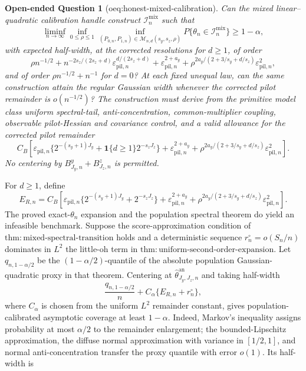 \documentclass{article}
\newtheorem{openendedquestion}{Open-ended Question}
\begin{document}
\begin{openendedquestion}[oeq:honest-mixed-calibration]\label{oeq:honest-mixed-calibration}
Can the mixed linear--quadratic calibration handle construct \(\mathcal I_n^{\mathrm{mix}}\) such that
\[
\liminf_{n\to\infty}\inf_{0\le\rho\le1}\inf_{(P_{0,n},P_{1,n})\in\mathcal M_{n,d}(s_y,s_z,\rho)}P\{\theta_n\in\mathcal I_n^{\mathrm{mix}}\}\ge1-\alpha,
\]
with expected half-width, at the corrected resolutions for \(d\ge1\), of order
\[
\rho n^{-1/2}
+n^{-2s_z/(2s_z+d)}\varepsilon_{\mathrm{pil},n}^{d/(2s_z+d)}
+\varepsilon_{\mathrm{pil},n}^{2+a_y}
+\rho^{2a_y/(2+3/s_y+d/s_z)}\varepsilon_{\mathrm{pil},n}^2,
\]
and of order \(\rho n^{-1/2}+n^{-1}\) for \(d=0\)?  At each fixed unequal law, can the same construction attain the regular Gaussian width whenever the corrected pilot remainder is \(o(n^{-1/2})\)? The construction must derive from the primitive model class uniform spectral-tail, anti-concentration, common-multiplier coupling, observable pilot-Hessian and covariance control, and a valid allowance for the corrected pilot remainder
\[
C_B\left[
\varepsilon_{\mathrm{pil},n}\{2^{-(s_y+1)J_y}+\mathbf 1\{d\ge1\}2^{-s_zJ_z}\}
+\varepsilon_{\mathrm{pil},n}^{2+a_y}
+\rho^{2a_y/(2+3/s_y+d/s_z)}\varepsilon_{\mathrm{pil},n}^2
\right].
\]
No centering by \(B^y_{J_y,n}+B^z_{J_z,n}\) is permitted.
\end{openendedquestion}
For \(d\ge1\), define
\[
E_{R,n}=C_B\left[
\varepsilon_{\mathrm{pil},n}\{2^{-(s_y+1)J_y}+2^{-s_zJ_z}\}
+\varepsilon_{\mathrm{pil},n}^{2+a_y}
+\rho^{2a_y/(2+3/s_y+d/s_z)}\varepsilon_{\mathrm{pil},n}^2
\right].
\]
The proved exact-\(\theta_n\) expansion and the population spectral theorem do yield an infeasible benchmark. Suppose the score-approximation condition of \(\mathrm{thm{:}mixed\text{-}spectral\text{-}transition}\) holds and a deterministic sequence \(r_n^{\circ}=o(S_n/n)\) dominates in \(L^2\) the little-oh term in \(\mathrm{thm{:}uniform\text{-}second\text{-}order\text{-}expansion}\). Let \(q_{n,1-\alpha/2}\) be the \((1-\alpha/2)\)-quantile of the absolute population Gaussian-quadratic proxy in that theorem. Centering at \(\widehat\theta^{\mathrm{an}}_{J_y,J_z,n}\) and taking half-width
\[
\frac{q_{n,1-\alpha/2}}{n}+C_\alpha\{E_{R,n}+r_n^{\circ}\},
\]
where \(C_\alpha\) is chosen from the uniform \(L^2\) remainder constant, gives population-calibrated asymptotic coverage at least \(1-\alpha\). Indeed, Markov's inequality assigns probability at most \(\alpha/2\) to the remainder enlargement; the bounded-Lipschitz approximation, the diffuse normal approximation with variance in \([1/2,1]\), and normal anti-concentration transfer the proxy quantile with error \(o(1)\). Its half-width is
\end{document}
